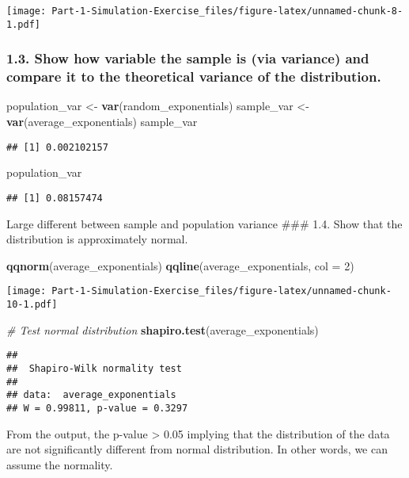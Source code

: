 \documentclass[]{article}
\newenvironment{Shaded}{\begin{snugshade}}{\end{snugshade}}
\newcommand{\KeywordTok}[1]{\textcolor[rgb]{0.13,0.29,0.53}{\textbf{#1}}}
\newcommand{\DataTypeTok}[1]{\textcolor[rgb]{0.13,0.29,0.53}{#1}}
\newcommand{\DecValTok}[1]{\textcolor[rgb]{0.00,0.00,0.81}{#1}}
\newcommand{\StringTok}[1]{\textcolor[rgb]{0.31,0.60,0.02}{#1}}
\newcommand{\CommentTok}[1]{\textcolor[rgb]{0.56,0.35,0.01}{\textit{#1}}}
\newcommand{\NormalTok}[1]{#1}
\begin{document}
\texttt{[image: Part-1-Simulation-Exercise\_files/figure-latex/unnamed-chunk-8-1.pdf]}

\subsubsection{1.3. Show how variable the sample is (via variance) and
compare it to the theoretical variance of the
distribution.}\label{show-how-variable-the-sample-is-via-variance-and-compare-it-to-the-theoretical-variance-of-the-distribution.}

\begin{Shaded}
\begin{Highlighting}[]
\NormalTok{population_var <-}\StringTok{ }\KeywordTok{var}\NormalTok{(random_exponentials)}
\NormalTok{sample_var <-}\StringTok{ }\KeywordTok{var}\NormalTok{(average_exponentials)}
\NormalTok{sample_var}
\end{Highlighting}
\end{Shaded}

\begin{verbatim}
## [1] 0.002102157
\end{verbatim}

\begin{Shaded}
\begin{Highlighting}[]
\NormalTok{population_var}
\end{Highlighting}
\end{Shaded}

\begin{verbatim}
## [1] 0.08157474
\end{verbatim}

Large different between sample and population variance \#\#\# 1.4. Show
that the distribution is approximately normal.

\begin{Shaded}
\begin{Highlighting}[]
\KeywordTok{qqnorm}\NormalTok{(average_exponentials)}
\KeywordTok{qqline}\NormalTok{(average_exponentials, }\DataTypeTok{col =} \DecValTok{2}\NormalTok{)}
\end{Highlighting}
\end{Shaded}

\texttt{[image: Part-1-Simulation-Exercise\_files/figure-latex/unnamed-chunk-10-1.pdf]}

\begin{Shaded}
\begin{Highlighting}[]
\CommentTok{# Test normal distribution}
\KeywordTok{shapiro.test}\NormalTok{(average_exponentials)}
\end{Highlighting}
\end{Shaded}

\begin{verbatim}
## 
##  Shapiro-Wilk normality test
## 
## data:  average_exponentials
## W = 0.99811, p-value = 0.3297
\end{verbatim}

From the output, the p-value \textgreater{} 0.05 implying that the
distribution of the data are not significantly different from normal
distribution. In other words, we can assume the normality.
\end{document}
